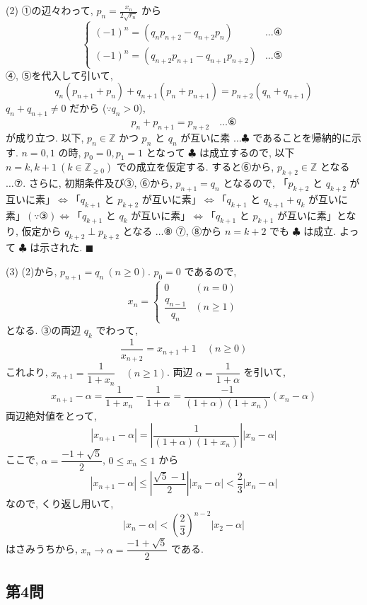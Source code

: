 \documentclass[../main.tex]{subfiles}
\begin{document}
(2) ①の辺々わって, $p_n = \frac{x_n}{2\sqrt{r_n}}$ から
\[
  \begin{cases}
    (-1)^n = (q_n p_{n+2} - q_{n+2} p_n) & \dots \text{④} \\
    (-1)^n = (q_{n+2} p_{n+1} - q_{n+1} p_{n+2}) & \dots \text{⑤}
  \end{cases}
\]
④, ⑤を代入して引いて,
\[
  q_n(p_{n+1} + p_n) + q_{n+1}(p_n + p_{n+1}) = p_{n+2}(q_n + q_{n+1})
\]
$q_n + q_{n+1} \neq 0$ だから ($\because q_n > 0$),
\[
  p_n + p_{n+1} = p_{n+2} \quad \dots \text{⑥}
\]
が成り立つ. 以下, $p_n \in \mathbb{Z}$ かつ $p_n$ と $q_n$ が互いに素 $\dots \clubsuit$ であることを帰納的に示す.
$n=0, 1$ の時, $p_0 = 0, p_1 = 1$ となって $\clubsuit$ は成立するので, 以下 $n=k, k+1 \ (k \in \mathbb{Z}_{\ge 0})$ での成立を仮定する.
すると⑥から, $p_{k+2} \in \mathbb{Z}$ となる $\dots \text{⑦}$. さらに, 初期条件及び③, ⑥から,
$p_{n+1} = q_n$ となるので, 「$p_{k+2}$ と $q_{k+2}$ が互いに素」$\iff$「$q_{k+1}$ と $p_{k+2}$ が互いに素」$\iff$「$q_{k+1}$ と $q_{k+1} + q_k$ が互いに素」$(\because \text{③}) \iff$「$q_{k+1}$ と $q_k$ が互いに素」$\iff$「$q_{k+1}$ と $p_{k+1}$ が互いに素」となり, 仮定から $q_{k+2} \perp p_{k+2}$ となる $\dots \text{⑧}$
⑦, ⑧から $n=k+2$ でも $\clubsuit$ は成立. よって $\clubsuit$ は示された. \hfill $\blacksquare$

\bigskip

(3) (2)から, $p_{n+1} = q_n \ (n \ge 0)$. $p_0 = 0$ であるので,
\[
  x_n =
  \begin{cases} 0 & (n = 0) \\ \dfrac{q_{n-1}}{q_n} & (n \ge 1)
  \end{cases}
\]
となる. ③の両辺 $q_k$ でわって,
\[
  \frac{1}{x_{n+2}} = x_{n+1} + 1 \quad (n \ge 0)
\]
これより, $x_{n+1} = \dfrac{1}{1 + x_n} \quad (n \ge 1)$.
両辺 $\alpha = \dfrac{1}{1 + \alpha}$ を引いて,
\[
  x_{n+1} - \alpha = \frac{1}{1 + x_n} - \frac{1}{1 + \alpha} = \frac{-1}{(1 + \alpha)(1 + x_n)} (x_n - \alpha)
\]
両辺絶対値をとって,
\[
  |x_{n+1} - \alpha| = \left| \frac{1}{(1 + \alpha)(1 + x_n)} \right| |x_n - \alpha|
\]
ここで, $\alpha = \dfrac{-1 + \sqrt{5}}{2}$, $0 \le x_n \le 1$ から
\[
  |x_{n+1} - \alpha| \le \left| \frac{\sqrt{5}-1}{2} \right| |x_n - \alpha| < \frac{2}{3} |x_n - \alpha|
\]
なので, くり返し用いて,
\[
  |x_n - \alpha| < \left(\frac{2}{3}\right)^{n-2} |x_2 - \alpha|
\]
はさみうちから, $x_n \longrightarrow \alpha = \dfrac{-1 + \sqrt{5}}{2}$ である.

\newpage

\subsection*{第4問}
\end{document}
